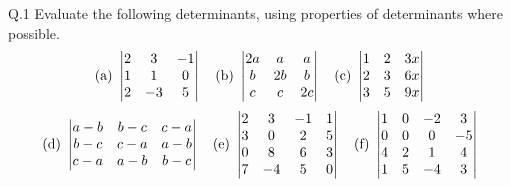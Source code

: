 \begin{question}{Q.1}
Evaluate the following determinants, using properties of determinants where
possible.
\[
\text{(a) }\begin{vmatrix}2&3&-1\\1&1&0\\2&-3&5\end{vmatrix}\quad
\text{(b) }\begin{vmatrix}2a&a&a\\b&2b&b\\c&c&2c\end{vmatrix}\quad
\text{(c) }\begin{vmatrix}1&2&3x\\2&3&6x\\3&5&9x\end{vmatrix}
\]
\[
\text{(d) }\begin{vmatrix}a-b&b-c&c-a\\b-c&c-a&a-b\\c-a&a-b&b-c\end{vmatrix}\quad
\text{(e) }\begin{vmatrix}2&3&-1&1\\3&0&2&5\\0&8&6&3\\7&-4&5&0\end{vmatrix}\quad
\text{(f) }\begin{vmatrix}1&0&-2&3\\0&0&0&-5\\4&2&1&4\\1&5&-4&3\end{vmatrix}
\]
\end{question}

